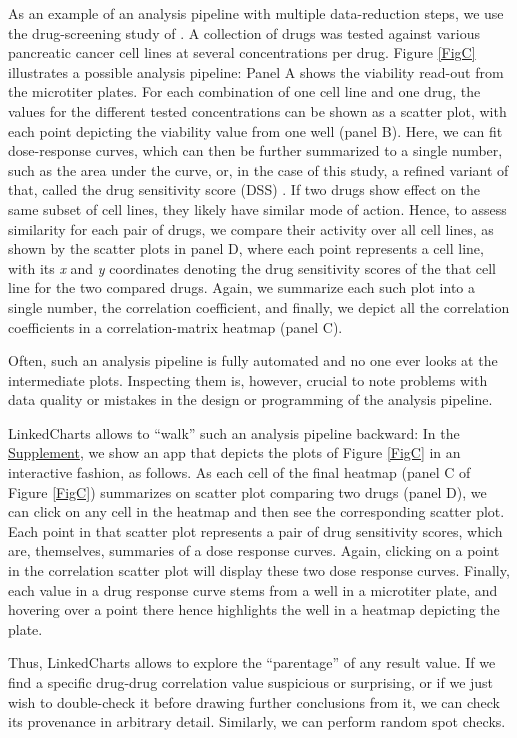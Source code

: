 \documentclass[twocolumn,10pt]{article}
\newcommand{\Supplement}{\href{https://anders-biostat.github.io/lc-paper/}{Supplement}}
\begin{document}
As an example of an analysis pipeline with multiple data-reduction steps, we use the drug-screening study of \citet{he_2018}. A collection of drugs was tested against various pancreatic cancer cell lines at several concentrations per drug. Figure \ref{FigC} illustrates a possible analysis pipeline: Panel A shows the viability read-out from the microtiter plates. For each combination of one cell line and one drug, the values for the different tested concentrations can be shown as a scatter plot, with each point depicting the viability value from one well (panel B). Here, we can fit dose-response curves, which can then be further summarized to a single number, such as the area under the curve, or, in the case of this study, a refined variant of that, called the drug sensitivity score (DSS) \citep{yadav_2014}. If two drugs show effect on the same subset of cell lines, they likely have similar mode of action. Hence, to assess similarity for each pair of drugs, we compare their activity over all cell lines, as shown by the scatter plots in panel D, where each point represents a cell line, with its \emph{x} and \emph{y} coordinates denoting the drug sensitivity scores of the that cell line for the two compared drugs. Again, we summarize each such plot into a single number, the correlation coefficient, and finally, we depict all the correlation coefficients in a correlation-matrix heatmap (panel C).

Often, such an analysis pipeline is fully automated and no one ever looks at the intermediate plots. Inspecting them is, however, crucial to note problems with data quality or mistakes in the design or programming of the analysis pipeline.

LinkedCharts allows to ``walk'' such an analysis pipeline backward: In the \Supplement, we show an app that depicts the plots of Figure \ref{FigC} in an interactive fashion, as follows. As each cell of the final heatmap (panel C of Figure \ref{FigC}) summarizes on scatter plot comparing two drugs (panel D), we can click on any cell in the heatmap and then see the corresponding scatter plot. Each point in that scatter plot represents a pair of drug sensitivity scores, which are, themselves, summaries of a dose response curves. Again, clicking on a point in the correlation scatter plot will display these two dose response curves. Finally, each value in a drug response curve stems from a well in a microtiter plate, and hovering over a point there hence highlights the well in a heatmap depicting the plate.

Thus, LinkedCharts allows to explore the ``parentage'' of any result value. If we find a specific drug-drug correlation value suspicious or surprising, or if we just wish to double-check it before drawing further conclusions from it, we can check its provenance in arbitrary detail. Similarly, we can perform random spot checks. 
\end{document}
